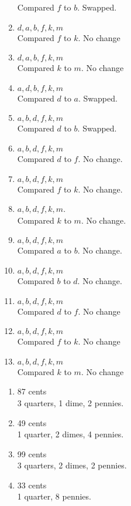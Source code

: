 \documentclass[12pt]{article}  %
\begin{document}
\begin{enumerate}
    Compared $f$ to $b$. Swapped.
    \item $d,a,b,f,k,m$\\
    Compared $f$ to $k$. No change
    \item $d,a,b,f,k,m$\\
    Compared $k$ to $m$. No change
    \item $a,d,b,f,k,m$\\
    Compared $d$ to $a$. Swapped.
    \item $a,b,d,f,k,m$\\
    Compared $d$ to $b$. Swapped.
    \item $a,b,d,f,k,m$\\
    Compared $d$ to $f$. No change.
    \item $a,b,d,f,k,m$\\
    Compared $f$ to $k$. No change.
    \item $a,b,d,f,k,m$.\\
    Compared $k$ to $m$. No change.
    \item $a,b,d,f,k,m$\\
    Compared $a$ to $b$. No change.
    \item $a,b,d,f,k,m$\\
    Compared $b$ to $d$. No change.
    \item $a,b,d,f,k,m$\\
    Compared $d$ to $f$. No change
    \item $a,b,d,f,k,m$\\
    Compared $f$ to $k$. No change
    \item $a,b,d,f,k,m$\\
    Compared $k$ to $m$. No change
\end{enumerate}

\begin{enumerate}
    \item 87 cents\\
    3 quarters, 1 dime, 2 pennies.
    \item 49 cents\\
    1 quarter, 2 dimes, 4 pennies.
    \item 99 cents\\
    3 quarters, 2 dimes, 2 pennies.
    \item 33 cents\\
    1 quarter, 8 pennies.
\end{enumerate}
\end{document}
